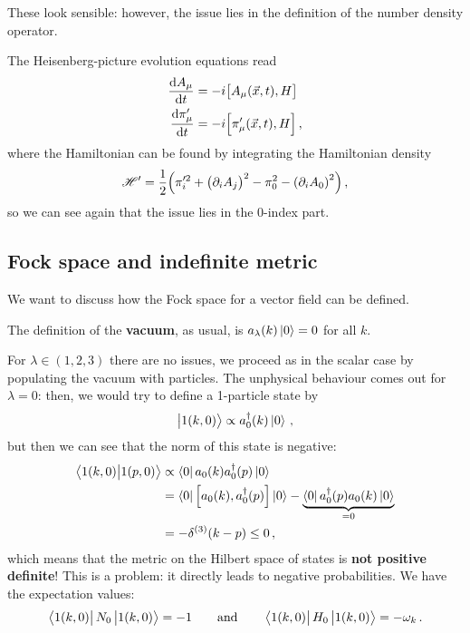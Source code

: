 \documentclass[main.tex]{subfiles}
\begin{document}
These look sensible: however, the issue lies in the definition of the number density operator. 

\begin{claim}
The Heisenberg-picture evolution equations read 
%
\begin{align}
\dv{A_{\mu }}{t} (\vec{x}, t) &= -i \qty[A_{\mu }(\vec{x}, t), H] \\
\dv{\pi'_{\mu }}{t} (\vec{x}, t) &= -i \qty[\pi '_{\mu }(\vec{x}, t), H]
\,,
\end{align}
%
where the Hamiltonian can be found by integrating the Hamiltonian density 
%
\begin{align}
\mathscr{H}' = \frac{1}{2} \qty(\pi^{\prime 2}_i + \qty(\partial_{i} A_{j})^2 - \pi_0^2 - \qty(\partial_{i} A_0 )^2)
\,,
\end{align}
%
so we can see again that the issue lies in the \(0\)-index part. 
\end{claim}

\subsection{Fock space and indefinite metric} 

We want to discuss how the Fock space for a vector field can be defined. 

The definition of the \textbf{vacuum}, as usual, is \(a_{\lambda } (k) \ket{0} = 0\) for all \(k\).

For \(\lambda \in (1, 2, 3)\) there are no issues, we proceed as in the scalar case by populating the vacuum with particles. The unphysical behaviour comes out for \(\lambda = 0\): then, we would try to define a 1-particle state by 
%
\begin{align}
\ket{1(k, 0)} \propto a ^\dag_{0} (k) \ket{0}
\,,
\end{align}
%
but then we can see that the norm of this state is negative: 
%
\begin{align}
\braket{1(k, 0)}{1(p, 0)} &\propto \bra{0} a_0 (k) a_0 ^\dag (p) \ket{0}  \\
&= \bra{0} \qty[ a_0 (k),  a_0 ^\dag (p)] \ket{0} - \underbrace{\bra{0} a_0 ^\dag (p) a_0 (k)  \ket{0}}_{= 0}  \\
&= - \delta^{(3)} (k-p) \leq 0
\,,
\end{align}
%
which means that the metric on the Hilbert space of states is \textbf{not positive definite}!
This is a problem: it directly leads to negative probabilities. 
We have the expectation values: 
%
\begin{align}
\bra{1(k, 0)} N_{0} \ket{1(k, 0)} = - 1 
\qquad \text{and} \qquad
\bra{1(k, 0)} H_{0} \ket{1(k, 0)} = - \omega_{k} 
\,.
\end{align}
\end{document}
